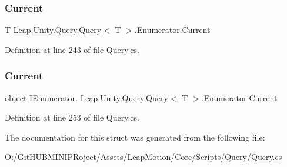 \subsubsection{\texorpdfstring{Current}{Current}\hspace{0.1cm}{\footnotesize\ttfamily [1/2]}}
{\footnotesize\ttfamily T \mbox{\hyperlink{struct_leap_1_1_unity_1_1_query_1_1_query}{Leap.\+Unity.\+Query.\+Query}}$<$ T $>$.Enumerator.\+Current\hspace{0.3cm}{\ttfamily [get]}}



Definition at line 243 of file Query.\+cs.

\mbox{\label{struct_leap_1_1_unity_1_1_query_1_1_query_1_1_enumerator_a47cac3a6e8199ed509d811a3a6322441}} 
\subsubsection{\texorpdfstring{Current}{Current}\hspace{0.1cm}{\footnotesize\ttfamily [2/2]}}
{\footnotesize\ttfamily object I\+Enumerator. \mbox{\hyperlink{struct_leap_1_1_unity_1_1_query_1_1_query}{Leap.\+Unity.\+Query.\+Query}}$<$ T $>$.Enumerator.\+Current\hspace{0.3cm}{\ttfamily [get]}}



Definition at line 253 of file Query.\+cs.



The documentation for this struct was generated from the following file\+:\begin{DoxyCompactItemize}
\item 
O\+:/\+Git\+H\+U\+B\+M\+I\+N\+I\+P\+Roject/\+Assets/\+Leap\+Motion/\+Core/\+Scripts/\+Query/\mbox{\hyperlink{_query_8cs}{Query.\+cs}}\end{DoxyCompactItemize}
